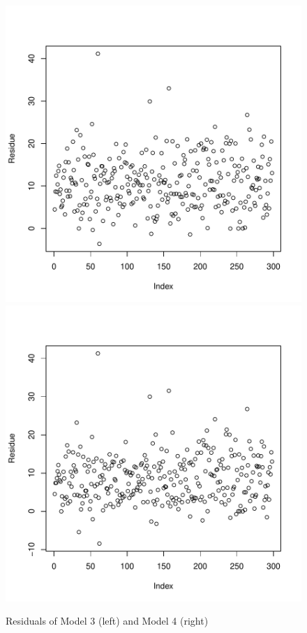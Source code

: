 \documentclass[english,final]{scrartcl}
\begin{document}
\begin{figure}[htbp]
\centering
\includegraphics{Geyser-Analysis-lm1_plot}
\hspace{1cm}
\includegraphics{Geyser-Analysis-plm2_plot}
\caption{Residuals of Model 3 (left) and Model 4 (right)}
\label{fig:residue2}
\end{figure}

\printbibliography[heading=bibintoc]
\end{document}
